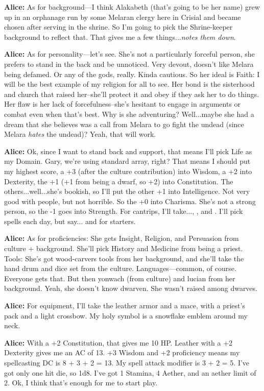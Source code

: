 \textbf{Alice:} As for background---I think Alakabeth (that's going to be her name) grew up in an orphanage run by some Melaran clergy here in Crisial and became chosen after serving in the shrine. So I'm going to pick the Shrine-keeper background to reflect that. That gives me a few things...\textit{notes them down}.

\textbf{Alice:} As for personality---let's see. She's not a particularly forceful person, she prefers to stand in the back and be unnoticed. Very devout, doesn't like Melara being defamed. Or any of the gods, really. Kinda cautious. So her ideal is Faith: I will be the best example of my religion for all to see. Her bond is the sisterhood and church that raised her--she'll protect it and obey if they ask her to do things. Her flaw is her lack of forcefulness--she's hesitant to engage in arguments or combat even when that's best. Why is she adventuring? Well...maybe she had a dream that she believes was a call from Melara to go fight the undead (since Melara \textit{hates} the undead)? Yeah, that will work.

\textbf{Alice:} Ok, since I want to stand back and support, that means I'll pick Life as my Domain. Gary, we're using standard array, right? That means I should put my highest score, a +3 (after the culture contribution) into Wisdom, a +2 into Dexterity, the +1 (+1 from being a dwarf, so +2) into Constitution. The others...well...she's bookish, so I'll put the other +1 into Intelligence. Not very good with people, but not horrible. So the +0 into Charisma. She's not a strong person, so the -1 goes into Strength. For cantrips, I'll take..., , and . I'll pick spells each day, but say... and  for starters.

\textbf{Alice:} As for proficiencies: She gets Insight, Religion, and Persuasion from culture + background. She'll pick History and Medicine from being a priest. Tools: She's got wood-carvers tools from her background, and she'll take the hand drum and dice set from the culture. Languages---common, of course. Everyone gets that. But then yonwach (from culture) and lucian from her background. Yeah, she doesn't know dwarven. She wasn't raised among dwarves.

\textbf{Alice:} For equipment, I'll take the leather armor and a mace, with a priest's pack and a light crossbow. My holy symbol is a snowflake emblem around my neck.

\textbf{Alice:} With a +2 Constitution, that gives me 10 HP. Leather with a +2 Dexterity gives me an AC of 13. +3 Wisdom and +2 proficiency means my spellcasting DC is 8 + 3 + 2 = 13. My spell attack modifier is 3 + 2 = 5. I've got only one hit die, so 1d8. I've got 1 Stamina, 4 Aether, and an aether limit of 2. Ok, I think that's enough for me to start play.

